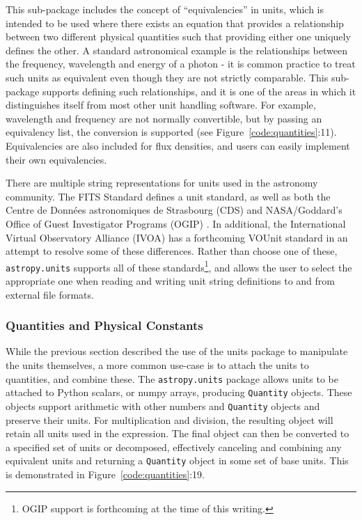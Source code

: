 \documentclass[traditabstract]{aa}
\begin{document}
This sub-package includes the concept of ``equivalencies'' in units, which is
intended to be used where there exists an equation that provides a
relationship between two different physical quantities such that providing
either one uniquely defines the other. A standard astronomical example is the
relationships between the frequency, wavelength and energy of a photon - it is
common practice to treat such units as equivalent even though they are not
strictly comparable. This sub-package supports defining such relationships,
and it is one of the areas in which it distinguishes itself from most other unit
handling software. For example, wavelength and frequency are not normally
convertible, but by passing an equivalency list, the conversion is supported
(see Figure~\ref{code:quantities}:11). Equivalencies are also included for flux
densities, and users can easily implement their own equivalencies.

There are multiple string representations for units used in the astronomy
community. The FITS Standard \cite{fits2008} defines a unit standard, as well
as both the Centre de Donn\'ees astronomiques de Strasbourg (CDS)
\citep{ochsenbein2000cds} and NASA/Goddard's Office of Guest Investigator
Programs (OGIP) \citep{george1995ogip}. In additional, the International
Virtual Observatory Alliance (IVOA) has a forthcoming VOUnit standard
\citep{derriere2012vounit} in an attempt to resolve some of these differences.
Rather than choose one of these, \texttt{astropy.units} supports all of these
standards\footnote{OGIP support is forthcoming at the time of this writing.},
and allows the user to select the appropriate one when reading and writing
unit string definitions to and from external file formats.

\subsubsection{Quantities and Physical Constants}

\label{sec:quantities}

While the previous section described the use of the units package to
manipulate the units themselves, a more common use-case is to attach
the units to quantities, and combine these. The \texttt{astropy.units}
package allows units to be attached to Python scalars, or \gls{numpy}
arrays, producing \texttt{Quantity} objects. These objects support
arithmetic with other numbers and \texttt{Quantity} objects and
preserve their units. For multiplication and division, the resulting
object will retain all units used in the expression.  The final object
can then be converted to a specified set of units or decomposed,
effectively canceling and combining any equivalent units and returning
a \texttt{Quantity} object in some set of base units. This is
demonstrated in Figure~\ref{code:quantities}:19.
\end{document}
